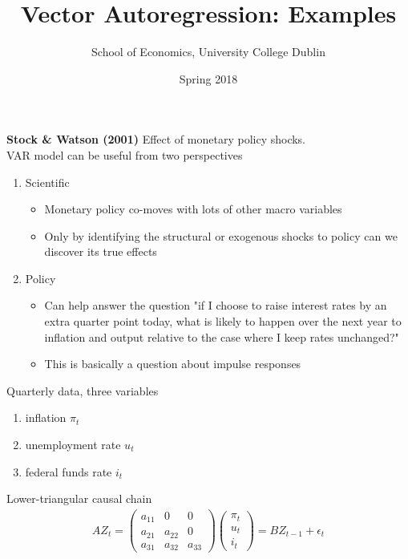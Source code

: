 \documentclass{beamer}
\title{Vector Autoregression: Examples}
\author{School of Economics, University College Dublin}
\date{Spring 2018}
\begin{document}
\begin{frame}
 \titlepage
\end{frame}

\begin{frame}
  \textbf{Stock \& Watson (2001)} Effect of monetary policy shocks. \\
   VAR model can be useful from two perspectives  
   \medskip
  \begin{enumerate}
    \item Scientific
    \begin{itemize}
      \item Monetary policy co-moves with lots of other macro variables
      \item Only by identifying the structural or exogenous shocks to policy can we discover its true effects
    \end{itemize}
    \medskip
    \item Policy
    \begin{itemize}
      \item Can help answer the question "if I choose to raise interest rates by an extra quarter point today, what is likely to
happen over the next year to inflation and output relative to the case
where I keep rates unchanged?"
    \item This is basically a question about impulse responses
    \end{itemize}
  \end{enumerate}
\end{frame}

\begin{frame}
  Quarterly data, three variables
\begin{enumerate}
  \item inflation $\pi_t$
  \item unemployment rate $u_t$
  \item federal funds rate $i_t$
\end{enumerate}
\medskip
Lower-triangular causal chain 
\begin{align}
  AZ_t = \begin{pmatrix}
    a_{11} & 0 & 0 \\
    a_{21} & a_{22} & 0\\
    a_{31} & a_{32} & a_{33}
  \end{pmatrix}
  \begin{pmatrix}
    \pi_t \\ u_t \\ i_t
  \end{pmatrix}
  = BZ_{t-1} + \epsilon_t
\end{align}
\end{frame}
\end{document}
